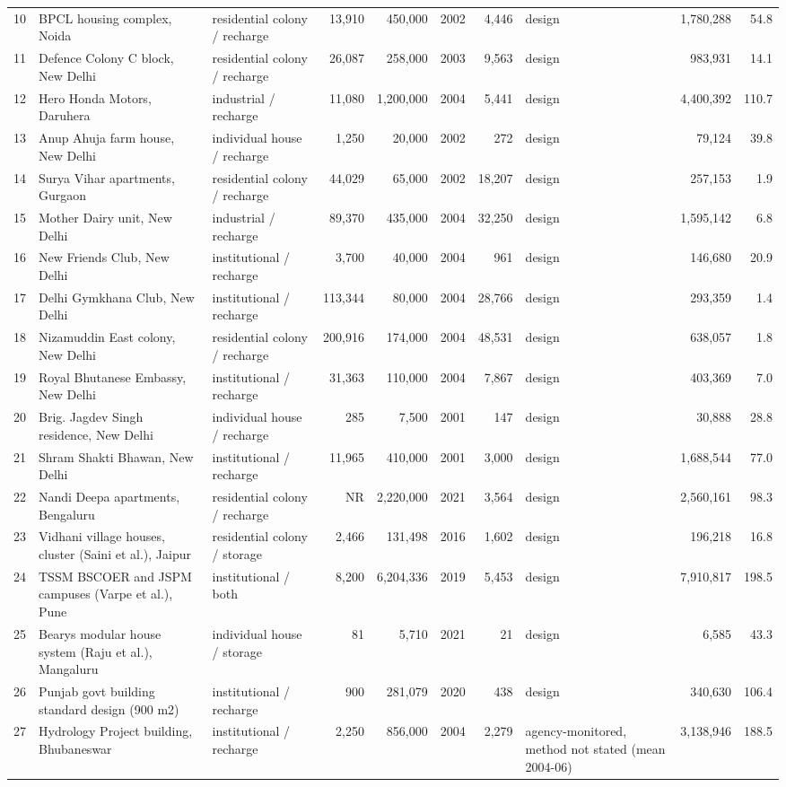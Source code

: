 {\begin{longtable}{l p{3.2cm} p{2.3cm} r r l r p{1.6cm} r r}
10 & BPCL housing complex, Noida & residential colony / recharge & 13,910 & 450,000 & 2002 & 4,446 & design & 1,780,288 & 54.8\\
11 & Defence Colony C block, New Delhi & residential colony / recharge & 26,087 & 258,000 & 2003 & 9,563 & design & 983,931 & 14.1\\
12 & Hero Honda Motors, Daruhera & industrial / recharge & 11,080 & 1,200,000 & 2004 & 5,441 & design & 4,400,392 & 110.7\\
13 & Anup Ahuja farm house, New Delhi & individual house / recharge & 1,250 & 20,000 & 2002 & 272 & design & 79,124 & 39.8\\
14 & Surya Vihar apartments, Gurgaon & residential colony / recharge & 44,029 & 65,000 & 2002 & 18,207 & design & 257,153 & 1.9\\
15 & Mother Dairy unit, New Delhi & industrial / recharge & 89,370 & 435,000 & 2004 & 32,250 & design & 1,595,142 & 6.8\\
16 & New Friends Club, New Delhi & institutional / recharge & 3,700 & 40,000 & 2004 & 961 & design & 146,680 & 20.9\\
17 & Delhi Gymkhana Club, New Delhi & institutional / recharge & 113,344 & 80,000 & 2004 & 28,766 & design & 293,359 & 1.4\\
18 & Nizamuddin East colony, New Delhi & residential colony / recharge & 200,916 & 174,000 & 2004 & 48,531 & design & 638,057 & 1.8\\
19 & Royal Bhutanese Embassy, New Delhi & institutional / recharge & 31,363 & 110,000 & 2004 & 7,867 & design & 403,369 & 7.0\\
20 & Brig. Jagdev Singh residence, New Delhi & individual house / recharge & 285 & 7,500 & 2001 & 147 & design & 30,888 & 28.8\\
21 & Shram Shakti Bhawan, New Delhi & institutional / recharge & 11,965 & 410,000 & 2001 & 3,000 & design & 1,688,544 & 77.0\\
22 & Nandi Deepa apartments, Bengaluru & residential colony / recharge & NR & 2,220,000 & 2021 & 3,564 & design & 2,560,161 & 98.3\\
23 & Vidhani village houses, cluster (Saini et al.), Jaipur & residential colony / storage & 2,466 & 131,498 & 2016 & 1,602 & design & 196,218 & 16.8\\
24 & TSSM BSCOER and JSPM campuses (Varpe et al.), Pune & institutional / both & 8,200 & 6,204,336 & 2019 & 5,453 & design & 7,910,817 & 198.5\\
25 & Bearys modular house system (Raju et al.), Mangaluru & individual house / storage & 81 & 5,710 & 2021 & 21 & design & 6,585 & 43.3\\
26 & Punjab govt building standard design (900 m2) & institutional / recharge & 900 & 281,079 & 2020 & 438 & design & 340,630 & 106.4\\
27 & Hydrology Project building, Bhubaneswar & institutional / recharge & 2,250 & 856,000 & 2004 & 2,279 & agency-monitored, method not stated (mean 2004-06) & 3,138,946 & 188.5\\
\end{longtable}}
